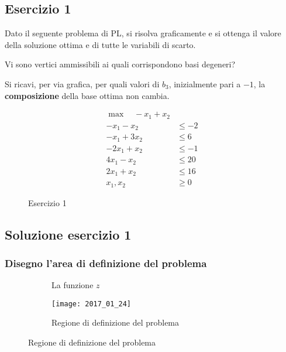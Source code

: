 \documentclass[\main/main.tex]{subfiles}
\begin{document}
\subsection{Esercizio 1}
Dato il seguente problema di PL, si risolva graficamente e si ottenga il valore della soluzione ottima e di tutte le variabili di scarto.

Vi sono vertici ammissibili ai quali corrispondono basi degeneri?

Si ricavi, per via grafica, per quali valori di $b_3$, inizialmente pari a $-1$, la \textbf{composizione} della base ottima non cambia.

\begin{figure}
  \begin{align*}
    \max \quad -x_1 + x_2 \\
    -x_1 -x_2   & \leq -2 \\
    -x_1 + 3x_2 & \leq 6  \\
    -2x_1 + x_2 & \leq -1 \\
    4x_1 - x_2  & \leq 20 \\
    2x_1 + x_2  & \leq 16 \\
    x_1, x_2    & \geq 0
  \end{align*}
  \caption{Esercizio 1}
\end{figure}

\subsection{Soluzione esercizio 1}
\subsubsection*{Disegno l'area di definizione del problema}
\begin{figure}
  \begin{subfigure}{0.45\textwidth}
    \caption{La funzione $z$}
  \end{subfigure}
  \begin{subfigure}{0.45\textwidth}
    \texttt{[image: 2017\_01\_24]}
    \caption{Regione di definizione del problema}
  \end{subfigure}
\end{figure}
\end{document}
